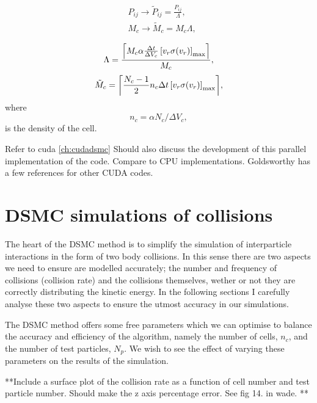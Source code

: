 \begin{subequations}
\begin{align}
    &P_{ij} \to \tilde{P}_{ij} = \frac{P_{ij}}{\Lambda},\\
    &M_{c}  \to \tilde{M}_{c}  = M_{c} \Lambda,
\end{align}
\end{subequations}

\begin{equation}
    \Lambda = \frac{ \ceil*{M_c \alpha \frac{\Delta t}{\Delta V_c} \left[ v_r\sigma(v_r) \right]_\mathrm{max} } }{M_c},
\end{equation}
\begin{equation}
    \tilde{M}_c = \ceil*{ \frac{N_c-1}{2}n_c\Delta t \left[v_r\sigma(v_r)\right]_{\mathrm{max}} },
\end{equation}
where
\begin{equation}
    n_c = \alpha N_c / \Delta V_c,
\end{equation}
is the density of the cell.


Refer to cuda \autoref{ch:cudadsmc} Should also discuss the development of this parallel implementation of the code. Compare to CPU implementations. Goldsworthy \cite{Goldsworthy2014} has a few references for other CUDA codes.


\section{DSMC simulations of collisions}

The heart of the DSMC method is to simplify the simulation of interparticle interactions in the form of two body collisions.
In this sense there are two aspects we need to ensure are modelled accurately; the number and frequency of collisions (collision rate) and the collisions themselves, wether or not they are correctly distributing the kinetic energy.
In the following sections I carefully analyse these two aspects to ensure the utmost accuracy in our simulations.

The DSMC method offers some free parameters which we can optimise to balance the accuracy and efficiency of the algorithm, namely the number of cells, $n_c$, and the number of test particles, $N_p$.
We wish to see the effect of varying these parameters on the results of the simulation.

**Include a surface plot of the collision rate as a function of cell number and test particle number.
Should make the z axis percentage error. See fig 14. in wade. **

